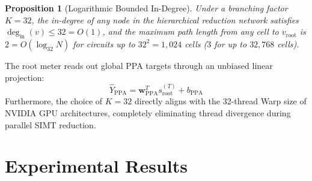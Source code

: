 \documentclass[conference]{IEEEtran}
\newtheorem{proposition}{Proposition}
\begin{document}
\begin{proposition}[Logarithmic Bounded In-Degree]
Under a branching factor $K=32$, the in-degree of any node in the hierarchical reduction network satisfies $\deg_{\text{in}}(v) \le 32 = O(1)$, and the maximum path length from any cell to $v_{\text{root}}$ is $2 = O(\log_{32} N)$ for circuits up to $32^2 = 1,024$ cells ($3$ for up to $32,768$ cells).
\end{proposition}

The root meter reads out global PPA targets through an unbiased linear projection:
\begin{equation}
\widehat{Y}_{\text{PPA}} = \mathbf{w}_{\text{PPA}}^T s_{\text{root}}^{(T)} + b_{\text{PPA}}
\end{equation}
Furthermore, the choice of $K=32$ directly aligns with the 32-thread Warp size of NVIDIA GPU architectures, completely eliminating thread divergence during parallel SIMT reduction.

\section{Experimental Results}
\end{document}
